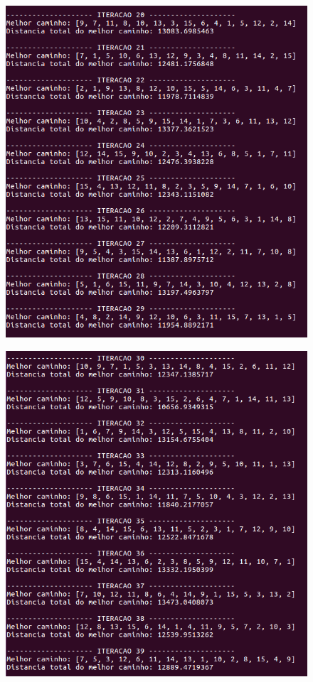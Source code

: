 \documentclass[hidelinks,12pt]{article}
\begin{document}
		\newpage
		
		\begin{figure}[!h]
			\centering
			\includegraphics[scale=0.6]{Figures/m15-2-3.png}
		\end{figure}

		\newpage
		
		\begin{figure}[!h]
			\centering
			\includegraphics[scale=0.6]{Figures/m15-2-4.png}
		\end{figure}
\end{document}

